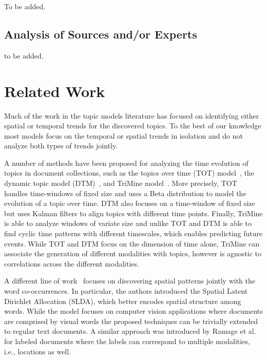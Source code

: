 \documentclass[conference]{IEEEtran}
\begin{document}
To be added.

\subsection{Analysis of Sources and/or Experts}

to be added.

%
\section{Related Work}
\label{sec:related_work}
Much of the work in the topic models literature has focused on identifying either spatial or temporal trends for the discovered topics. To the best of our knowledge most models focus on the temporal or spatial trends in isolation and do not analyze both types of trends jointly. 

A number of methods have been proposed for analyzing the time evolution of topics in document collections, such as the topics over time (TOT) model~\cite{wang:2006}, the dynamic topic model (DTM)~\cite{blei:2006}, and TriMine model~\cite{matsubara:2012}.  More precisely, TOT handles time-windows of fixed size and uses a Beta distribution to model the evolution of a topic over time. DTM  also focuses on a time-window of fixed size but uses Kalman filters to align topics with different time points. Finally, TriMine is able to analyze windows of variate size and unlike TOT and DTM is able to find cyclic time patterns with different timescales, which enables predicting future events. While TOT and DTM focus on the dimension of time alone, TriMine can associate the generation of different modalities with topics, however is agnostic to correlations across the different modalities.

A different line of work~\cite{wang:2007} focuses on discovering spatial patterns jointly with the word co-occurrences. In particular, the authors introduced the Spatial Latent Dirichlet Allocation (SLDA), which better encodes spatial structure among words. While the model focuses on computer vision applications where documents are comprised by visual words the proposed techniques can be trivially extended to regular text documents. A similar approach was introduced by Ramage et al.~\cite{ramage:2009} for labeled documents where the labels can correspond to multiple modalities, i.e., locations as well.
\end{document}
